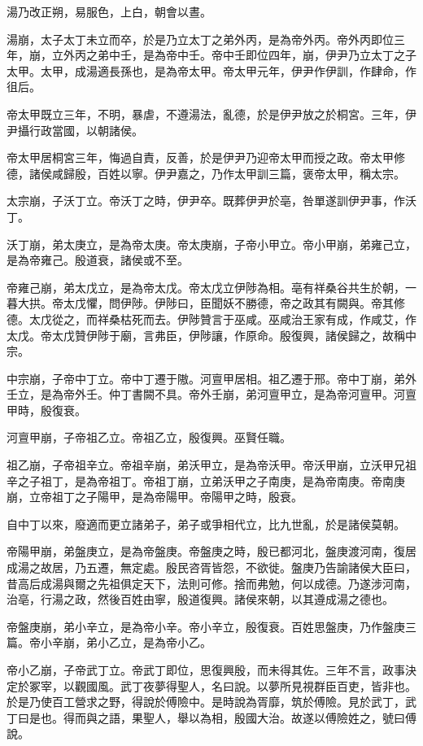 湯乃改正朔，易服色，上白，朝會以晝。

湯崩，太子太丁未立而卒，於是乃立太丁之弟外丙，是為帝外丙。帝外丙即位三年，崩，立外丙之弟中壬，是為帝中壬。帝中壬即位四年，崩，伊尹乃立太丁之子太甲。太甲，成湯適長孫也，是為帝太甲。帝太甲元年，伊尹作伊訓，作肆命，作徂后。

帝太甲既立三年，不明，暴虐，不遵湯法，亂德，於是伊尹放之於桐宮。三年，伊尹攝行政當國，以朝諸侯。

帝太甲居桐宮三年，悔過自責，反善，於是伊尹乃迎帝太甲而授之政。帝太甲修德，諸侯咸歸殷，百姓以寧。伊尹嘉之，乃作太甲訓三篇，褒帝太甲，稱太宗。

太宗崩，子沃丁立。帝沃丁之時，伊尹卒。既葬伊尹於亳，咎單遂訓伊尹事，作沃丁。

沃丁崩，弟太庚立，是為帝太庚。帝太庚崩，子帝小甲立。帝小甲崩，弟雍己立，是為帝雍己。殷道衰，諸侯或不至。

帝雍己崩，弟太戊立，是為帝太戊。帝太戊立伊陟為相。亳有祥桑谷共生於朝，一暮大拱。帝太戊懼，問伊陟。伊陟曰，臣聞妖不勝德，帝之政其有闕與。帝其修德。太戊從之，而祥桑枯死而去。伊陟贊言于巫咸。巫咸治王家有成，作咸艾，作太戊。帝太戊贊伊陟于廟，言弗臣，伊陟讓，作原命。殷復興，諸侯歸之，故稱中宗。

中宗崩，子帝中丁立。帝中丁遷于隞。河亶甲居相。祖乙遷于邢。帝中丁崩，弟外壬立，是為帝外壬。仲丁書闕不具。帝外壬崩，弟河亶甲立，是為帝河亶甲。河亶甲時，殷復衰。

河亶甲崩，子帝祖乙立。帝祖乙立，殷復興。巫賢任職。

祖乙崩，子帝祖辛立。帝祖辛崩，弟沃甲立，是為帝沃甲。帝沃甲崩，立沃甲兄祖辛之子祖丁，是為帝祖丁。帝祖丁崩，立弟沃甲之子南庚，是為帝南庚。帝南庚崩，立帝祖丁之子陽甲，是為帝陽甲。帝陽甲之時，殷衰。

自中丁以來，廢適而更立諸弟子，弟子或爭相代立，比九世亂，於是諸侯莫朝。

帝陽甲崩，弟盤庚立，是為帝盤庚。帝盤庚之時，殷已都河北，盤庚渡河南，復居成湯之故居，乃五遷，無定處。殷民咨胥皆怨，不欲徙。盤庚乃告諭諸侯大臣曰，昔高后成湯與爾之先祖俱定天下，法則可修。捨而弗勉，何以成德。乃遂涉河南，治亳，行湯之政，然後百姓由寧，殷道復興。諸侯來朝，以其遵成湯之德也。

帝盤庚崩，弟小辛立，是為帝小辛。帝小辛立，殷復衰。百姓思盤庚，乃作盤庚三篇。帝小辛崩，弟小乙立，是為帝小乙。

帝小乙崩，子帝武丁立。帝武丁即位，思復興殷，而未得其佐。三年不言，政事決定於冢宰，以觀國風。武丁夜夢得聖人，名曰說。以夢所見視群臣百吏，皆非也。於是乃使百工營求之野，得說於傅險中。是時說為胥靡，筑於傅險。見於武丁，武丁曰是也。得而與之語，果聖人，舉以為相，殷國大治。故遂以傅險姓之，號曰傅說。

